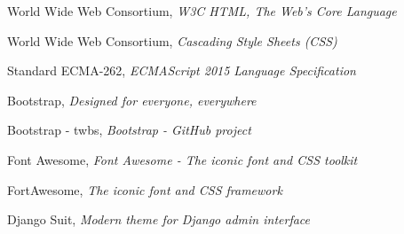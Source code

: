 \begin{thebibliography}{99}
	World Wide Web Consortium, \emph{W3C HTML, The Web’s Core Language} \\
	
	World Wide Web Consortium, \emph{Cascading Style Sheets (CSS)} \\
	
	Standard ECMA-262, \emph{ECMAScript 2015 Language Specification} \\
	
	Bootstrap, \emph{Designed for everyone, everywhere} \\

	Bootstrap - twbs, \emph{Bootstrap - GitHub project} \\
	
	Font Awesome, \emph{Font Awesome - The iconic font and CSS toolkit} \\

	FortAwesome, \emph{The iconic font and CSS framework} \\

	Django Suit, \emph{Modern theme for Django admin interface} \\
	 \\
	
\end{thebibliography}